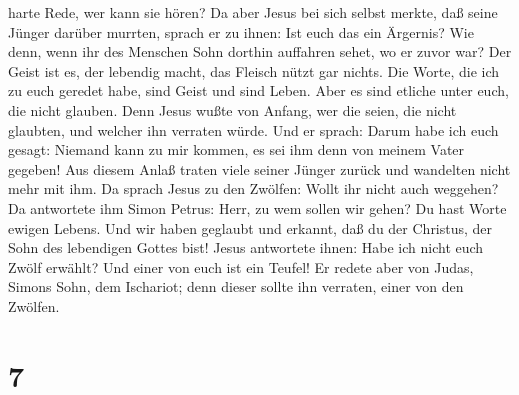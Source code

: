harte Rede, wer kann sie hören?  Da aber Jesus bei sich
selbst merkte, daß seine Jünger darüber murrten, sprach er zu ihnen: Ist
euch das ein Ärgernis?  Wie denn, wenn ihr des Menschen
Sohn dorthin auffahren sehet, wo er zuvor war?  Der Geist
ist es, der lebendig macht, das Fleisch nützt gar nichts. Die Worte, die
ich zu euch geredet habe, sind Geist und sind Leben. 
Aber es sind etliche unter euch, die nicht glauben. Denn Jesus wußte von
Anfang, wer die seien, die nicht glaubten, und welcher ihn verraten
würde.  Und er sprach: Darum habe ich euch gesagt:
Niemand kann zu mir kommen, es sei ihm denn von meinem Vater gegeben!
 Aus diesem Anlaß traten viele seiner Jünger zurück und
wandelten nicht mehr mit ihm.  Da sprach Jesus zu den
Zwölfen: Wollt ihr nicht auch weggehen?  Da antwortete
ihm Simon Petrus: Herr, zu wem sollen wir gehen? Du hast Worte ewigen
Lebens.  Und wir haben geglaubt und erkannt, daß du der
Christus, der Sohn des lebendigen Gottes bist!  Jesus
antwortete ihnen: Habe ich nicht euch Zwölf erwählt? Und einer von euch
ist ein Teufel!  Er redete aber von Judas, Simons Sohn,
dem Ischariot; denn dieser sollte ihn verraten, einer von den Zwölfen.

\hypertarget{section-6}{%
\section{7}\label{section-6}}

